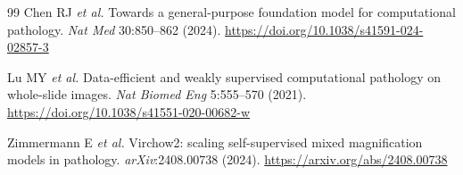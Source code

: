 \documentclass[a4paper,10pt,twocolumn]{extarticle}
\begin{document}
\begin{thebibliography}{99}
Chen RJ \textit{et al.} Towards a general-purpose foundation model for
computational pathology. \textit{Nat Med} 30:850--862 (2024).
\url{https://doi.org/10.1038/s41591-024-02857-3}

Lu MY \textit{et al.} Data-efficient and weakly supervised computational
pathology on whole-slide images.
\textit{Nat Biomed Eng} 5:555--570 (2021).
\url{https://doi.org/10.1038/s41551-020-00682-w}

Zimmermann E \textit{et al.} Virchow2: scaling self-supervised mixed
magnification models in pathology. \textit{arXiv}:2408.00738 (2024).
\url{https://arxiv.org/abs/2408.00738}

\end{thebibliography}
\endgroup
\end{document}
